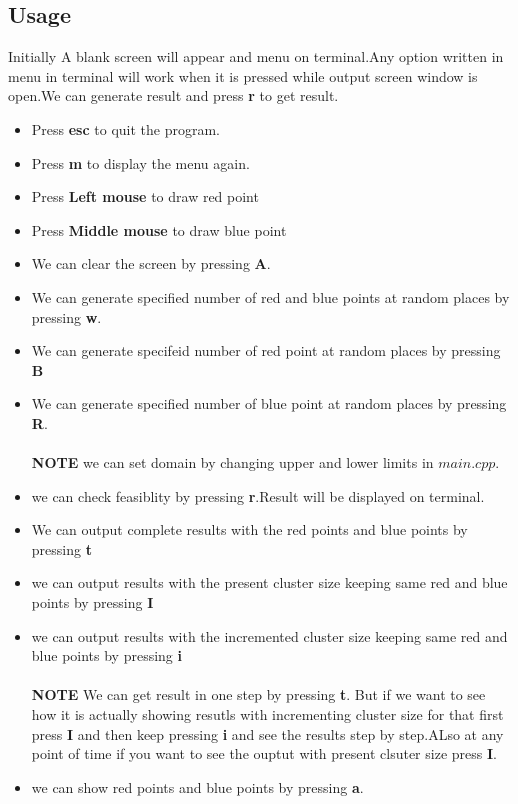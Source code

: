 \documentclass[a4paper,10pt]{report}
\begin{document}
\subsection{Usage}
Initially A blank screen will appear and menu on terminal.Any option written in menu in terminal will work when it
is pressed while output screen window is open.We can generate result  and press \textbf{r} to get result.
\begin{itemize}
 \item Press \textbf{esc} to quit the program.
 \item Press \textbf{m} to display the menu again.
 \item Press \textbf{Left mouse} to draw red point
 \item Press \textbf{Middle mouse} to draw blue point
 \item We can clear the screen by pressing \textbf{A}.
 \item We can generate specified number of red and blue points at random places by pressing \textbf{w}.
 \item We can generate specifeid number of red point at random places by pressing \textbf{B}
 \item We can generate specified number of blue point at random places by pressing \textbf{R}.\\ \\
 \textbf{NOTE} we can set domain by changing upper and lower limits in $main.cpp$.
 \item we can check feasiblity by pressing \textbf{r}.Result will be displayed on terminal.
 \item We can output complete results with the red points and blue points by pressing \textbf{t}
 \item we can output results with the present cluster size keeping same red and blue points by pressing \textbf{I}
 \item we can output results with the incremented cluster size keeping same red and blue points by pressing \textbf{i}\\ \\
 \textbf{NOTE} We can get result in one step by pressing \textbf{t}. But if we want to see how it is actually showing
 resutls with incrementing cluster size for that first press \textbf{I} and then keep pressing \textbf{i} and see the
 results step by step.ALso at any point of time if you want to see the ouptut with present clsuter size press \textbf{I}.
 \item we can show red points and blue points  by pressing \textbf{a}.

\end{itemize}
\end{document}
